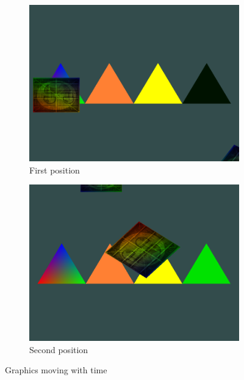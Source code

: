 \documentclass[a4paper, 12pt]{article}
\begin{document}
    \begin{figure}[H]
        \centering
        \begin{subfigure}[b]{0.45\textwidth}
            \centering
            \includegraphics[width=\textwidth]{openGLMovingFirst.png}
            \caption{First position}
        \end{subfigure}
        \hfill
        \begin{subfigure}[b]{0.45\textwidth}
            \centering
            \includegraphics[width=\textwidth]{openGLMovingSecond.png}
            \caption{Second position}
        \end{subfigure}
        \caption{Graphics moving with time}
    \end{figure}
\end{document}
